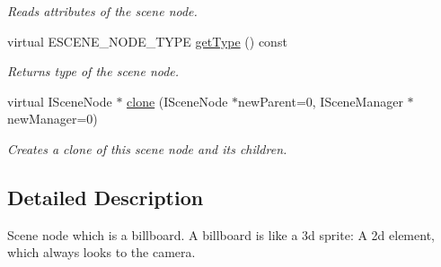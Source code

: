 \begin{DoxyCompactItemize}
\begin{DoxyCompactList}\small\item\em Reads attributes of the scene node. \end{DoxyCompactList}\item 
\hypertarget{classirr_1_1scene_1_1_c_billboard_scene_node_a23f7f96f4a2ed26ca9617144712e49c6}{virtual E\-S\-C\-E\-N\-E\-\_\-\-N\-O\-D\-E\-\_\-\-T\-Y\-P\-E \hyperlink{classirr_1_1scene_1_1_c_billboard_scene_node_a23f7f96f4a2ed26ca9617144712e49c6}{get\-Type} () const }\label{classirr_1_1scene_1_1_c_billboard_scene_node_a23f7f96f4a2ed26ca9617144712e49c6}

\begin{DoxyCompactList}\small\item\em Returns type of the scene node. \end{DoxyCompactList}\item 
\hypertarget{classirr_1_1scene_1_1_c_billboard_scene_node_ad7379c0601c0b1f2e4f47a3f6e65e4dd}{virtual I\-Scene\-Node $\ast$ \hyperlink{classirr_1_1scene_1_1_c_billboard_scene_node_ad7379c0601c0b1f2e4f47a3f6e65e4dd}{clone} (I\-Scene\-Node $\ast$new\-Parent=0, I\-Scene\-Manager $\ast$new\-Manager=0)}\label{classirr_1_1scene_1_1_c_billboard_scene_node_ad7379c0601c0b1f2e4f47a3f6e65e4dd}

\begin{DoxyCompactList}\small\item\em Creates a clone of this scene node and its children. \end{DoxyCompactList}\end{DoxyCompactItemize}


\subsection{Detailed Description}
Scene node which is a billboard. A billboard is like a 3d sprite\-: A 2d element, which always looks to the camera. 

